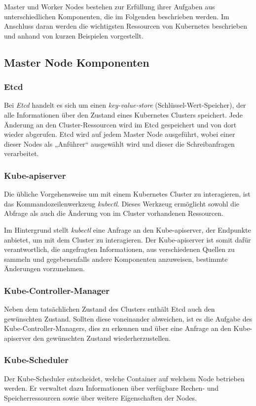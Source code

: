 \documentclass[11pt,a4paper]{article}
\begin{document}
Master und Worker Nodes bestehen zur Erfüllung ihrer Aufgaben aus unterschiedlichen Komponenten,
die im Folgenden beschrieben werden. Im Anschluss daran werden die wichtigsten Ressourcen
von Kubernetes beschrieben und anhand von kurzen Beispielen vorgestellt.

\subsection{Master Node Komponenten}
\subsubsection{Etcd}
\label{Etcd}
Bei \emph{Etcd} handelt es sich um einen \emph{key-value-store} (Schlüssel-Wert-Speicher),
der alle Informationen über den Zustand eines Kubernetes Clusters speichert.
Jede Änderung an den Cluster-Ressourcen wird im Etcd gespeichert und von dort wieder abgerufen.
Etcd wird auf jedem Master Node ausgeführt, wobei einer dieser Nodes als „Anführer“
ausgewählt wird und dieser die Schreibanfragen verarbeitet.

\subsubsection{Kube-apiserver}
\label{sec:Kube-apiverver}
Die übliche Vorgehensweise um mit einem Kubernetes Cluster zu interagieren, ist das Kommandozeilenwerkzeug \emph{kubectl}.
Dieses Werkzeug ermöglicht sowohl die Abfrage als auch die Änderung von im Cluster vorhandenen Ressourcen.

Im Hintergrund stellt \emph{kubectl} eine Anfrage an den Kube-apiserver, der Endpunkte anbietet,
um mit dem Cluster zu interagieren. Der Kube-apiserver ist somit dafür verantwortlich, die angefragten Informationen,
aus verschiedenen Quellen zu sammeln und gegebenenfalls andere Komponenten anzuweisen, bestimmte Änderungen vorzunehmen.

\subsubsection{Kube-Controller-Manager}
Neben dem tatsächlichen Zustand des Clusters enthält Etcd auch den gewünschten Zustand.
Sollten diese voneinander abweichen, ist es die Aufgabe des Kube-Controller-Managers,
dies zu erkennen und über eine Anfrage an den Kube-apiserver den gewünschten Zustand wiederherzustellen.


\subsubsection{Kube-Scheduler}
\label{sec:Kube-Scheduler}
Der Kube-Scheduler entscheidet, welche Container auf welchem Node betrieben werden.
Er verwaltet dazu Informationen über verfügbare Rechen- und Speicherressourcen sowie über weitere Eigenschaften
der Nodes.
\end{document}
